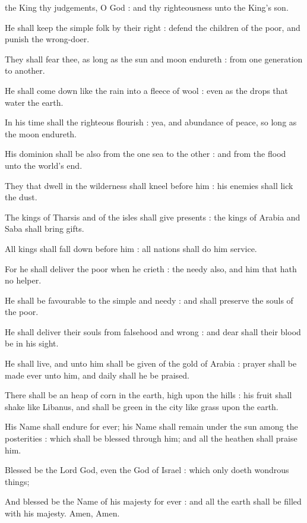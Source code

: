  the King thy judgements, O God : and thy righteousness unto the King's son.\par
{}
He shall keep the simple folk by their right : defend the children of the poor, and punish the wrong-doer.\par
{}They shall fear thee, as long as the sun and moon endureth : from one generation to another.\par
{}He shall come down like the rain into a fleece of wool : even as the drops that water the earth.\par
{}In his time shall the righteous flourish : yea, and abundance of peace, so long as the moon endureth.\par
{}His dominion shall be also from the one sea to the other : and from the flood unto the world's end.\par
{}They that dwell in the wilderness shall kneel before him : his enemies shall lick the dust.\par
{}The kings of Tharsis and of the isles shall give presents : the kings of Arabia and Saba shall bring gifts.\par
{}All kings shall fall down before him : all nations shall do him service.\par
{}For he shall deliver the poor when he crieth : the needy also, and him that hath no helper.\par
{}He shall be favourable to the simple and needy : and shall preserve the souls of the poor.\par
{}He shall deliver their souls from falsehood and wrong : and dear shall their blood be in his sight.\par
{}He shall live, and unto him shall be given of the gold of Arabia : prayer shall be made ever unto him, and daily shall he be praised.\par
{}There shall be an heap of corn in the earth, high upon the hills : his fruit shall shake like Libanus, and shall be green in the city like grass upon the earth.\par
{}His Name shall endure for ever; his Name shall remain under the sun among the posterities : which shall be blessed through him; and all the heathen shall praise him.\par
{}Blessed be the Lord God, even the God of Israel : which only doeth wondrous things;\par
{}And blessed be the Name of his majesty for ever : and all the earth shall be filled with his majesty. Amen, Amen.\par

